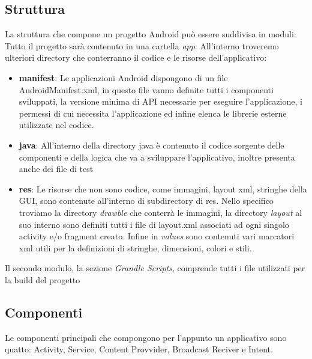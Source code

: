\subsection{Struttura}
La struttura che compone un progetto Android può essere suddivisa in moduli. Tutto il progetto sarà contenuto in una cartella \textit{app}. All'interno troveremo ulteriori directory che conterranno il codice e le risorse dell'applicativo: 
\begin{itemize}
    \item \textbf{manifest}: Le applicazioni Android dispongono di un file AndroidManifest.xml, in questo file vanno definite tutti i componenti sviluppati, la versione minima di API necessarie per eseguire l'applicazione, i permessi di cui necessita l'applicazione ed infine elenca le librerie esterne utilizzate nel codice.  
    \item \textbf{java}: All'interno della directory java è contenuto il codice sorgente delle componenti e della logica che va a sviluppare l'applicativo, inoltre presenta anche dei file di test
    \item \textbf{res}: Le risorse che non sono codice, come immagini, layout xml, stringhe della GUI, sono contenute all'interno di subdirectory di res. Nello specifico troviamo la directory \textit{drawble} che conterrà le immagini, la directory \textit{layout} al suo interno sono definiti tutti i file di layout.xml associati ad ogni singolo activity e/o fragment creato. Infine in \textit{values} sono contenuti vari marcatori xml utili per la definizioni di stringhe, dimensioni, colori e stili.   
\end{itemize}
Il secondo modulo, la sezione \textit{Grandle Scripts}, comprende tutti i file utilizzati per la build del progetto
\subsection{Componenti}
Le componenti principali che compongono per l'appunto un applicativo sono quatto: Activity, Service, Content Provvider, Broadcast Reciver e Intent. 

   

